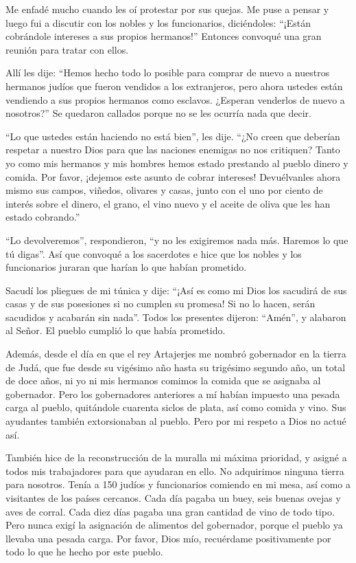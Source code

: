  Me enfadé mucho cuando les oí protestar por sus quejas.
 Me puse a pensar y luego fui a discutir con los nobles y
los funcionarios, diciéndoles: ``¡Están cobrándole intereses a sus
propios hermanos!'' Entonces convoqué una gran reunión para tratar con
ellos.

 Allí les dije: ``Hemos hecho todo lo posible para comprar
de nuevo a nuestros hermanos judíos que fueron vendidos a los
extranjeros, pero ahora ustedes están vendiendo a sus propios hermanos
como esclavos. ¿Esperan venderlos de nuevo a nosotros?'' Se quedaron
callados porque no se les ocurría nada que decir.

 ``Lo que ustedes están haciendo no está bien'', les dije.
``¿No creen que deberían respetar a nuestro Dios para que las naciones
enemigas no nos critiquen?  Tanto yo como mis hermanos y
mis hombres hemos estado prestando al pueblo dinero y comida. Por favor,
¡dejemos este asunto de cobrar intereses!  Devuélvanles
ahora mismo sus campos, viñedos, olivares y casas, junto con el uno por
ciento de interés sobre el dinero, el grano, el vino nuevo y el aceite
de oliva que les han estado cobrando.''

 ``Lo devolveremos'', respondieron, ``y no les exigiremos
nada más. Haremos lo que tú digas''. Así que convoqué a los sacerdotes e
hice que los nobles y los funcionarios juraran que harían lo que habían
prometido.

 Sacudí los pliegues de mi túnica y dije: ``¡Así es como mi
Dios los sacudirá de sus casas y de sus posesiones si no cumplen su
promesa! Si no lo hacen, serán sacudidos y acabarán sin nada''. Todos
los presentes dijeron: ``Amén'', y alabaron al Señor. El pueblo cumplió
lo que había prometido.

 Además, desde el día en que el rey Artajerjes me nombró
gobernador en la tierra de Judá, que fue desde su vigésimo año hasta su
trigésimo segundo año, un total de doce años, ni yo ni mis hermanos
comimos la comida que se asignaba al gobernador.  Pero los
gobernadores anteriores a mí habían impuesto una pesada carga al pueblo,
quitándole cuarenta siclos de plata, así como comida y vino. Sus
ayudantes también extorsionaban al pueblo. Pero por mi respeto a Dios no
actué así.

 También hice de la reconstrucción de la muralla mi máxima
prioridad, y asigné a todos mis trabajadores para que ayudaran en ello.
No adquirimos ninguna tierra para nosotros.  Tenía a 150
judíos y funcionarios comiendo en mi mesa, así como a visitantes de los
países cercanos.  Cada día pagaba un buey, seis buenas
ovejas y aves de corral. Cada diez días pagaba una gran cantidad de vino
de todo tipo. Pero nunca exigí la asignación de alimentos del
gobernador, porque el pueblo ya llevaba una pesada carga. 
Por favor, Dios mío, recuérdame positivamente por todo lo que he hecho
por este pueblo.

